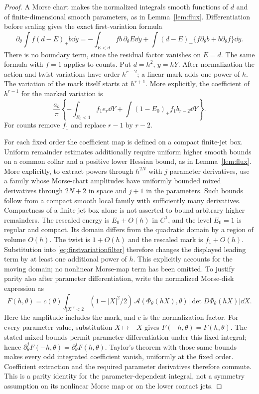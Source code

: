 \begin{proof}
A Morse chart makes the normalized integrals smooth functions of $d$
and of finite-dimensional smooth parameters, as in
Lemma~\ref{lem:flux}. Differentiation before scaling gives the exact
first-variation formula
\begin{equation}\label{eq:firstvariationfilter}
 \partial_\theta\int f(d-E)_+b\dd y
 =-\int_{E<d}f b\,\partial_\theta E\dd y
  +\int(d-E)_+\{f\partial_\theta b+b\partial_\theta f\}\dd y.
\end{equation}
There is no boundary term, since the residual factor vanishes on
$E=d$. The same formula with $f=1$ applies to counts.
Put $d=h^2$, $y=hY$. After normalization the action and twist
variations have order $h^{r-2}$; a linear mark adds one power of $h$.
The variation of the mark itself starts at $h^{r+1}$. More explicitly,
the coefficient of $h^{r-1}$ for the marked variation is
\begin{equation}\label{eq:filteredcoefficient}
 \frac{a_b}{\pi}\left\{-\int_{E_0<1}f_1e_r\dd Y
              +\int(1-E_0)_+f_1b_{r-2}\dd Y\right\}.
\end{equation}
For counts remove $f_1$ and replace $r-1$ by $r-2$.

For each fixed order the coefficient map is defined on a compact
finite-jet box. Uniform remainder estimates additionally require uniform
higher smooth bounds on a common collar and a positive lower Hessian
bound, as in Lemma~\ref{lem:flux}. More explicitly, to extract powers
through $h^{2N}$ with $j$ parameter derivatives, use a family whose
Morse-chart amplitudes have uniformly bounded mixed derivatives through
$2N+2$ in space and $j+1$ in the parameters. Such bounds follow from
a compact smooth local family with sufficiently many derivatives.
Compactness of a finite jet box alone is not asserted to bound arbitrary
higher remainders.
The rescaled energy is $E_0+O(h)$ in $C^1$, and the level $E_0=1$
is regular and compact. Its domain differs from the quadratic domain
by a region of volume $O(h)$. The twist is $1+O(h)$ and the rescaled
mark is $f_1+O(h)$. Substitution into
\eqref{eq:firstvariationfilter} therefore changes the displayed leading
term by at least one additional power of $h$. This explicitly accounts
for the moving domain; no nonlinear Morse-map term has been omitted.
To justify parity also after parameter differentiation, write the
normalized Morse-disk expression as
\[
 F(h,\theta)=c(\theta)\int_{|X|^2<2}
 (1-|X|^2/2)\,\mathcal A(\Phi_\theta(hX),\theta)
                    |\det D\Phi_\theta(hX)|\dd X.
\]
Here the amplitude includes the mark, and $c$ is the normalization
factor. For every parameter value, substitution $X\mapsto-X$ gives
$F(-h,\theta)=F(h,\theta)$. The stated mixed bounds permit
parameter differentiation under this fixed integral; hence
$\partial_\theta^jF(-h,\theta)=\partial_\theta^jF(h,\theta)$.
Taylor's theorem with those same bounds makes every odd integrated
coefficient vanish, uniformly at the fixed order. Coefficient extraction
and the required parameter derivatives therefore commute. This is a
parity identity for the parameter-dependent integral, not a symmetry
assumption on its nonlinear Morse map or on the lower contact jets.


\end{proof}
